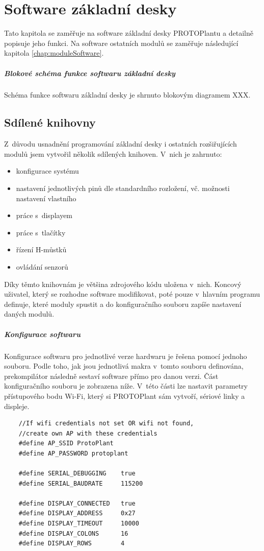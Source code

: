 \chapter*{Software základní desky}
Tato kapitola se zaměřuje na software základní desky PROTOPlantu a detailně popisuje jeho funkci.
Na software ostatních modulů se zaměřuje následující kapitola \ref{chap:moduleSoftware}.

\paragraph{Blokové schéma funkce softwaru základní desky}
Schéma funkce softwaru základní desky je shrnuto blokovým diagramem XXX.

\section*{Sdílené knihovny}
Z~důvodu usnadnění programování základní desky i ostatních rozšiřujících modulů jsem vytvořil několik sdílených knihoven. 
V~nich je zahrnuto:
\begin{itemize}
    \item konfigurace systému
    \item nastavení jednotlivých pinů dle standardního rozložení, vč. možnosti nastavení vlastního
    \item práce s~displayem
    \item práce s~tlačítky
    \item řízení H-můstků
    \item ovládání senzorů
\end{itemize}
Díky těmto knihovnám je většina zdrojového kódu uložena v~nich. 
Koncový uživatel, který se rozhodne software modifikovat, poté pouze v~hlavním programu definuje, které moduly spustit a do konfiguračního souboru zapíše nastavení daných modulů.

\paragraph{Konfigurace softwaru}
Konfigurace softwaru pro jednotlivé verze hardwaru je řešena pomocí jednoho souboru.
Podle toho, jak jsou jednotlivá makra v~tomto souboru definována, prekompilátor následně sestaví software přímo pro danou verzi.
Část konfiguračního souboru je zobrazena níže.
V~této části lze nastavit parametry přístupového bodu Wi-Fi, který si PROTOPlant sám vytvoří, sériové linky a displeje.
\begin{lstlisting}
    //If wifi credentials not set OR wifi not found, 
    //create own AP with these credentials
    #define AP_SSID ProtoPlant
    #define AP_PASSWORD protoplant
    
    #define SERIAL_DEBUGGING    true
    #define SERIAL_BAUDRATE     115200
    
    #define DISPLAY_CONNECTED   true
    #define DISPLAY_ADDRESS     0x27
    #define DISPLAY_TIMEOUT     10000
    #define DISPLAY_COLONS      16
    #define DISPLAY_ROWS        4
\end{lstlisting}

